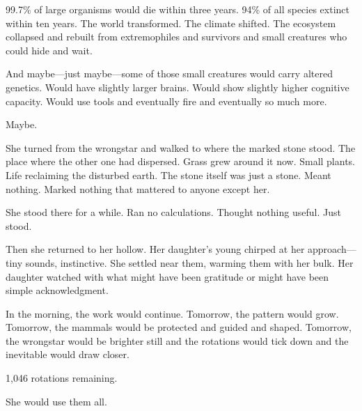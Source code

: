 99.7\% of large organisms would die within three years. 94\% of all species extinct within ten years. The world transformed. The climate shifted. The ecosystem collapsed and rebuilt from extremophiles and survivors and small creatures who could hide and wait.

And maybe—just maybe—some of those small creatures would carry altered genetics. Would have slightly larger brains. Would show slightly higher cognitive capacity. Would use tools and eventually fire and eventually so much more.

Maybe.

She turned from the wrongstar and walked to where the marked stone stood. The place where the other one had dispersed. Grass grew around it now. Small plants. Life reclaiming the disturbed earth. The stone itself was just a stone. Meant nothing. Marked nothing that mattered to anyone except her.

She stood there for a while. Ran no calculations. Thought nothing useful. Just stood.

Then she returned to her hollow. Her daughter's young chirped at her approach—tiny sounds, instinctive. She settled near them, warming them with her bulk. Her daughter watched with what might have been gratitude or might have been simple acknowledgment.

In the morning, the work would continue. Tomorrow, the pattern would grow. Tomorrow, the mammals would be protected and guided and shaped. Tomorrow, the wrongstar would be brighter still and the rotations would tick down and the inevitable would draw closer.

1,046 rotations remaining.

She would use them all.

